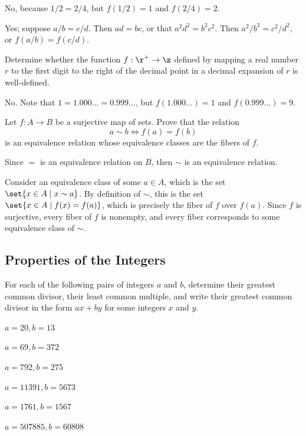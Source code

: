 \begin{solalph}
    \item No, because $1/2 = 2/4$, but $f(1/2) = 1$ and $f(2/4) = 2$.
    \item Yes; suppose $a/b = c/d$. Then $ad = bc$, or that $a^2d^2 = b^2c^2$. Then $a^2/b^2 = c^2/d^2$, or $f(a/b) = f(c/d)$. 
\end{solalph}

\begin{exercise}\label{ex0.1.6}
    Determine whether the function $f: \r^+ \to \z$ defined by mapping a real number $r$ to the first digit to the right of the decimal point in a decimal expansion of $r$ is well-defined.
\end{exercise}

\begin{sol}
    No. Note that $1=1.000\ldots = 0.999\ldots$, but $f(1.000\ldots) = 1$ and $f(0.999\ldots) = 9$.
\end{sol}

\begin{exercise}\label{ex0.1.7}
    Let $f: A \to B$ be a surjective map of sets. Prove that the relation
    \[a \sim b \iff f(a) = f(b)\]
    is an equivalence relation whose equivalence classes are the fibers of $f$.
\end{exercise}

\begin{sol}
    Since $=$ is an equivalence relation on $B$, then $\sim$ is an equivalence relation.

    Consider an equivalence class of some $a \in A$, which is the set $\set{x \in A \mid x \sim a}$. By definition of $\sim$, this is the set $\set{x \in A \mid f(x) = f(a)}$, which is precisely the fiber of $f$ over $f(a)$. Since $f$ is surjective, every fiber of $f$ is nonempty, and every fiber corresponds to some equivalence class of $\sim$.
\end{sol}

\newpage

\subsection{Properties of the Integers}

\begin{exercise} \label{ex0.2.1}
    For each of the following pairs of integers $a$ and $b$, determine their greatest common divisor, their least common multiple, and write their greatest common divisor in the form $ax + by$ for some integers $x$ and $y$.
    \begin{subproblems}
        \item $a = 20, b = 13$
        \item $a= 69, b = 372$
        \item $a = 792, b = 275$
        \item $a = 11391, b = 5673$
        \item $a= 1761, b = 1567$
        \item $a = 507885, b = 60808$
    \end{subproblems}
\end{exercise}

